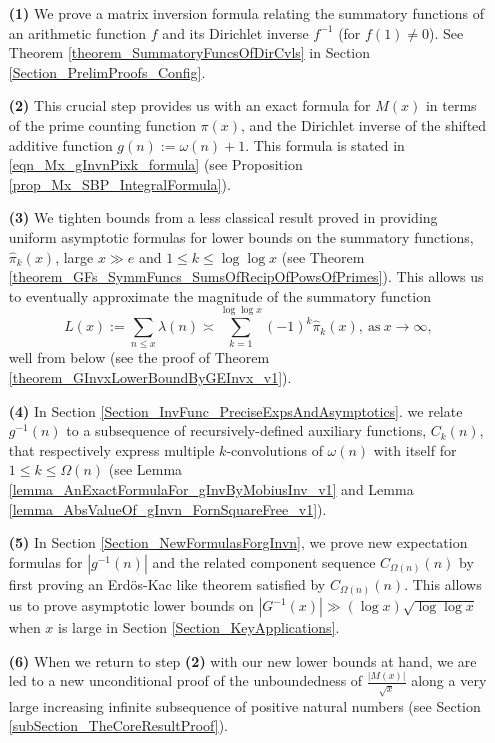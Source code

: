 \documentclass[11pt,reqno,a4letter]{article}
\numberwithin{figure}{section}
\numberwithin{table}{section}
\theoremstyle{plain}
\numberwithin{theorem}{section}
\theoremstyle{definition}
\begin{document}
\begin{itemize} 

\item[\textbf{(1)}] We prove a matrix inversion formula relating the summatory 
           functions of an arithmetic function $f$ and its Dirichlet inverse $f^{-1}$ (for $f(1) \neq 0$). 
           See Theorem \ref{theorem_SummatoryFuncsOfDirCvls} in 
           Section \ref{Section_PrelimProofs_Config}.  
\item[\textbf{(2)}] This crucial step provides us with an exact formula for $M(x)$ in terms of 
           the prime counting function $\pi(x)$, and the 
           Dirichlet inverse of the shifted additive function $g(n) := \omega(n) + 1$. This 
           formula is stated in \eqref{eqn_Mx_gInvnPixk_formula} 
           (see Proposition \ref{prop_Mx_SBP_IntegralFormula}). 
\item[\textbf{(3)}] We tighten bounds from a less classical result proved in 
            \cite[\S 7]{MV} providing uniform asymptotic formulas for lower bounds on the  
           summatory functions, $\widehat{\pi}_k(x)$, large $x \gg e$ and 
           $1 \leq k \leq \log\log x$ 
           (see Theorem \ref{theorem_GFs_SymmFuncs_SumsOfRecipOfPowsOfPrimes}). 
           This allows us to eventually approximate the magnitude of the summatory function 
           \[
           L(x) := \sum_{n \leq x} \lambda(n) \asymp 
                \sum_{k=1}^{\log\log x} (-1)^k \widehat{\pi}_k(x), 
                \mathrm{\ as\ } x \rightarrow \infty, 
           \]
           well from below (see the proof of 
           Theorem \ref{theorem_GInvxLowerBoundByGEInvx_v1}). 
\item[\textbf{(4)}] In 
           Section \ref{Section_InvFunc_PreciseExpsAndAsymptotics}. 
           we relate $g^{-1}(n)$ to a subsequence of recursively-defined auxiliary functions, $C_k(n)$, 
           that respectively express multiple $k$-convolutions of $\omega(n)$ with itself for 
           $1 \leq k \leq \Omega(n)$ 
           (see Lemma \ref{lemma_AnExactFormulaFor_gInvByMobiusInv_v1} and 
           Lemma \ref{lemma_AbsValueOf_gInvn_FornSquareFree_v1}). 
\item[\textbf{(5)}] In Section \ref{Section_NewFormulasForgInvn}, 
           we prove new expectation formulas for $|g^{-1}(n)|$ and the related component sequence 
           $C_{\Omega(n)}(n)$ by first proving an Erd\"os-Kac like theorem satisfied by $C_{\Omega(n)}(n)$. 
           This allows us to prove asymptotic lower bounds on 
           $|G^{-1}(x)| \gg (\log x) \sqrt{\log\log x}$ when $x$ is large in 
           Section \ref{Section_KeyApplications}. 
\item[\textbf{(6)}] When we return to step \textbf{(2)} 
           with our new lower bounds at hand, we are led to a new unconditional proof of the 
           unboundedness of $\frac{|M(x)|}{\sqrt{x}}$ 
           along a very large increasing infinite subsequence of positive natural numbers 
           (see Section \ref{subSection_TheCoreResultProof}). 
           
\end{itemize} 
\end{document}
